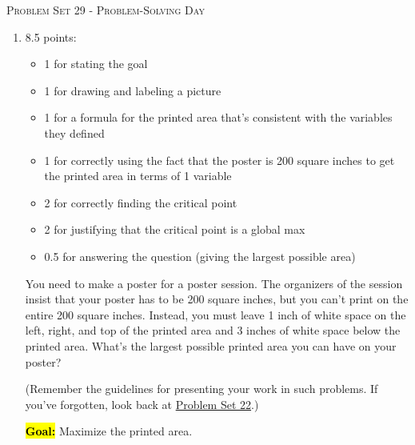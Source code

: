 \documentclass{article}
\newcommand{\highlight}[1]{\boldmath\hl{\textbf{#1}}\unboldmath}
\begin{document}
\begin{center}
  \large\textsc{Problem Set 29 - Problem-Solving Day}
\end{center}

\begin{enumerate}
\item  \begin{grading}
    8.5 points:
    \begin{itemize}[nosep]
    \item 1 for stating the goal
    \item 1 for drawing and labeling a picture
    \item 1 for a formula for the printed area that's consistent with the variables they defined
    \item 1 for correctly using the fact that the poster is 200 square inches to get the printed area in terms of 1 variable
    \item 2 for correctly finding the critical point
    \item 2 for justifying that the critical point is a global max
    \item 0.5 for answering the question (giving the largest possible area)
    \end{itemize}
  \end{grading}

  \begin{problem}[\newpage]
    You need to make a poster for a poster session. The organizers of the session insist that your poster has to be 200 square inches, but you can't print on the entire 200 square inches. Instead, you must leave 1 inch of white space on the left, right, and top of the printed area and 3 inches of white space below the printed area. What's the largest possible printed area you can have on your poster?

    (Remember the guidelines for presenting your work in such problems. If you've forgotten, look back at \href{https://canvas.harvard.edu/courses/138327/files/21097693?wrap=1}{Problem Set 22}.)
  \end{problem}

  \begin{solution}
    \highlight{Goal:} Maximize the printed area. 


\end{solution}
\end{enumerate}
\end{document}
